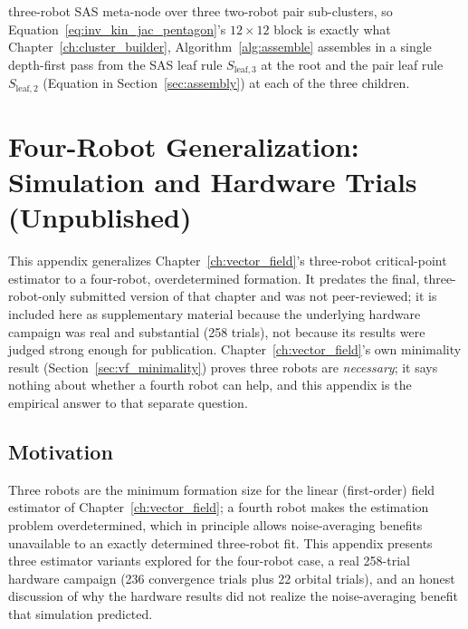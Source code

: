\documentclass[12pt, letterpaper, oneside]{report}
\begin{document}
three-robot SAS meta-node over three two-robot pair sub-clusters,
so Equation~\eqref{eq:inv_kin_jac_pentagon}'s $12\times12$ block is
exactly what Chapter~\ref{ch:cluster_builder}, Algorithm~\ref{alg:assemble}
assembles in a single depth-first pass from the SAS leaf rule
$S_{\text{leaf},3}$ at the root and the pair leaf rule
$S_{\text{leaf},2}$ (Equation in Section~\ref{sec:assembly}) at each of
the three children.

\chapter{Four-Robot Generalization: Simulation and Hardware Trials (Unpublished)}
\label{app:four_robot}

This appendix generalizes Chapter~\ref{ch:vector_field}'s three-robot
critical-point estimator to a four-robot, overdetermined formation. It
predates the final, three-robot-only submitted version of that chapter
and was not peer-reviewed; it is included here as supplementary material
because the underlying hardware campaign was real and substantial (258
trials), not because its results were judged strong enough for
publication. Chapter~\ref{ch:vector_field}'s own minimality result
(Section~\ref{sec:vf_minimality}) proves three robots are
\emph{necessary}; it says nothing about whether a fourth robot can help,
and this appendix is the empirical answer to that separate question.

\section{Motivation}

Three robots are the minimum formation size for the linear (first-order)
field estimator of Chapter~\ref{ch:vector_field}; a fourth robot makes
the estimation problem overdetermined, which in principle allows
noise-averaging benefits unavailable to an exactly determined
three-robot fit. This appendix presents three estimator variants
explored for the four-robot case, a real 258-trial hardware campaign
(236 convergence trials plus 22 orbital trials), and an honest
discussion of why the hardware results did not realize the
noise-averaging benefit that simulation predicted.
\end{document}
